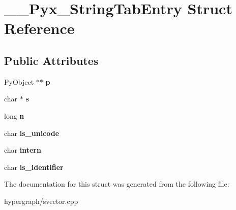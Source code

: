 \hypertarget{struct____Pyx__StringTabEntry}{
\section{\_\-\_\-Pyx\_\-StringTabEntry Struct Reference}
\label{struct____Pyx__StringTabEntry}
}
\subsection*{Public Attributes}
\begin{DoxyCompactItemize}
\item 
\hypertarget{struct____Pyx__StringTabEntry_a2885d198c871ac1e963ebd42adb04391}{
PyObject $\ast$$\ast$ {\bfseries p}}
\label{struct____Pyx__StringTabEntry_a2885d198c871ac1e963ebd42adb04391}

\item 
\hypertarget{struct____Pyx__StringTabEntry_af3940744f0fde77e9d5fc3e40314eae6}{
char $\ast$ {\bfseries s}}
\label{struct____Pyx__StringTabEntry_af3940744f0fde77e9d5fc3e40314eae6}

\item 
\hypertarget{struct____Pyx__StringTabEntry_a38ade39847ba03badabd559e78911c7f}{
long {\bfseries n}}
\label{struct____Pyx__StringTabEntry_a38ade39847ba03badabd559e78911c7f}

\item 
\hypertarget{struct____Pyx__StringTabEntry_ad3dd0dc735b64c37ab30c8c7ac5a7c9c}{
char {\bfseries is\_\-unicode}}
\label{struct____Pyx__StringTabEntry_ad3dd0dc735b64c37ab30c8c7ac5a7c9c}

\item 
\hypertarget{struct____Pyx__StringTabEntry_ae874dc013ae7e2f4dc493c96066b1cc2}{
char {\bfseries intern}}
\label{struct____Pyx__StringTabEntry_ae874dc013ae7e2f4dc493c96066b1cc2}

\item 
\hypertarget{struct____Pyx__StringTabEntry_ac4207479c5f1620aedca6d4fa885891d}{
char {\bfseries is\_\-identifier}}
\label{struct____Pyx__StringTabEntry_ac4207479c5f1620aedca6d4fa885891d}

\end{DoxyCompactItemize}


The documentation for this struct was generated from the following file:\begin{DoxyCompactItemize}
\item 
hypergraph/svector.cpp\end{DoxyCompactItemize}
